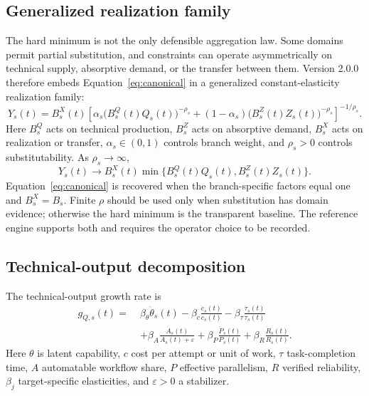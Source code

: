 \subsection{Generalized realization family}

The hard minimum is not the only defensible aggregation law. Some domains permit partial substitution, and constraints can operate asymmetrically on technical supply, absorptive demand, or the transfer between them. Version 2.0.0 therefore embeds Equation~\eqref{eq:canonical} in a generalized constant-elasticity realization family:
\begin{equation}
\label{eq:generalized-realization}
\boxed{
Y_s(t)=B_s^X(t)
\left[
\alpha_s\bigl(B_s^Q(t)Q_s(t)\bigr)^{-\rho_s}
+(1-\alpha_s)\bigl(B_s^Z(t)Z_s(t)\bigr)^{-\rho_s}
\right]^{-1/\rho_s}.}
\end{equation}
Here $B_s^Q$ acts on technical production, $B_s^Z$ acts on absorptive demand, $B_s^X$ acts on realization or transfer, $\alpha_s\in(0,1)$ controls branch weight, and $\rho_s>0$ controls substitutability. As $\rho_s\rightarrow\infty$,
\begin{equation}
Y_s(t)\rightarrow B_s^X(t)\min\{B_s^Q(t)Q_s(t),B_s^Z(t)Z_s(t)\}.
\end{equation}
Equation~\eqref{eq:canonical} is recovered when the branch-specific factors equal one and $B_s^X=B_s$. Finite $\rho$ should be used only when substitution has domain evidence; otherwise the hard minimum is the transparent baseline. The reference engine supports both and requires the operator choice to be recorded.

\subsection{Technical-output decomposition}

The technical-output growth rate is
\begin{equation}
\label{eq:technical-growth}
\boxed{
\begin{aligned}
g_{Q,s}(t)=\;&\beta_\theta\dot\theta_s(t)
-\beta_c\frac{\dot c_s(t)}{c_s(t)}
-\beta_\tau\frac{\dot\tau_s(t)}{\tau_s(t)}\\
&+\beta_A\frac{\dot A_s(t)}{A_s(t)+\varepsilon}
+\beta_P\frac{\dot P_s(t)}{P_s(t)}
+\beta_R\frac{\dot R_s(t)}{R_s(t)}.
\end{aligned}}
\end{equation}
Here $\theta$ is latent capability, $c$ cost per attempt or unit of work, $\tau$ task-completion time, $A$ automatable workflow share, $P$ effective parallelism, $R$ verified reliability, $\beta_j$ target-specific elasticities, and $\varepsilon>0$ a stabilizer.

